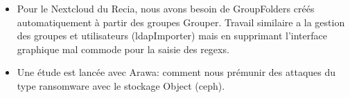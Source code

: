 \begin{frame}{\sub}
\begin{itemize}

\item Pour le Nextcloud du Recia, nous avons  besoin de GroupFolders créés automatiquement à partir des groupes Grouper.
Travail similaire a la gestion des groupes et utilisateurs (ldapImporter) mais en supprimant l'interface graphique mal commode pour la saisie des regexs. 

\item Une étude est lancée avec Arawa: comment nous prémunir des attaques du type ransomware avec le stockage Object (ceph).
\end{itemize}
\end{frame}
